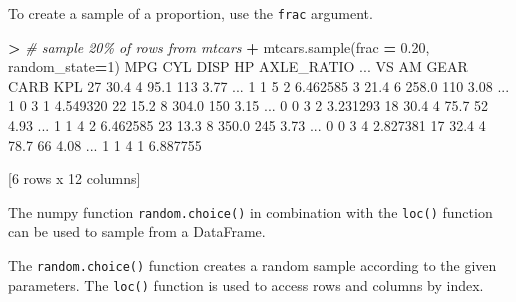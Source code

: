 \documentclass[
]{book}
\newenvironment{Shaded}{\begin{snugshade}}{\end{snugshade}}
\newcommand{\CommentTok}[1]{\textcolor[rgb]{0.56,0.35,0.01}{\textit{#1}}}
\newcommand{\DecValTok}[1]{\textcolor[rgb]{0.00,0.00,0.81}{#1}}
\newcommand{\FloatTok}[1]{\textcolor[rgb]{0.00,0.00,0.81}{#1}}
\newcommand{\NormalTok}[1]{#1}
\newcommand{\OperatorTok}[1]{\textcolor[rgb]{0.81,0.36,0.00}{\textbf{#1}}}
\begin{document}
To create a sample of a proportion, use the \texttt{frac} argument.

\begin{Shaded}
\begin{Highlighting}[]
\OperatorTok{\textgreater{}} \CommentTok{\# sample 20\% of rows from mtcars}
\OperatorTok{+}\NormalTok{ mtcars.sample(frac }\OperatorTok{=} \FloatTok{0.20}\NormalTok{, random\_state}\OperatorTok{=}\DecValTok{1}\NormalTok{)}
\NormalTok{     MPG  CYL   DISP   HP  AXLE\_RATIO  ...  VS  AM  GEAR CARB       KPL}
\DecValTok{27}  \FloatTok{30.4}    \DecValTok{4}   \FloatTok{95.1}  \DecValTok{113}        \FloatTok{3.77}\NormalTok{  ...   }\DecValTok{1}   \DecValTok{1}     \DecValTok{5}    \DecValTok{2}  \FloatTok{6.462585}
\DecValTok{3}   \FloatTok{21.4}    \DecValTok{6}  \FloatTok{258.0}  \DecValTok{110}        \FloatTok{3.08}\NormalTok{  ...   }\DecValTok{1}   \DecValTok{0}     \DecValTok{3}    \DecValTok{1}  \FloatTok{4.549320}
\DecValTok{22}  \FloatTok{15.2}    \DecValTok{8}  \FloatTok{304.0}  \DecValTok{150}        \FloatTok{3.15}\NormalTok{  ...   }\DecValTok{0}   \DecValTok{0}     \DecValTok{3}    \DecValTok{2}  \FloatTok{3.231293}
\DecValTok{18}  \FloatTok{30.4}    \DecValTok{4}   \FloatTok{75.7}   \DecValTok{52}        \FloatTok{4.93}\NormalTok{  ...   }\DecValTok{1}   \DecValTok{1}     \DecValTok{4}    \DecValTok{2}  \FloatTok{6.462585}
\DecValTok{23}  \FloatTok{13.3}    \DecValTok{8}  \FloatTok{350.0}  \DecValTok{245}        \FloatTok{3.73}\NormalTok{  ...   }\DecValTok{0}   \DecValTok{0}     \DecValTok{3}    \DecValTok{4}  \FloatTok{2.827381}
\DecValTok{17}  \FloatTok{32.4}    \DecValTok{4}   \FloatTok{78.7}   \DecValTok{66}        \FloatTok{4.08}\NormalTok{  ...   }\DecValTok{1}   \DecValTok{1}     \DecValTok{4}    \DecValTok{1}  \FloatTok{6.887755}

\NormalTok{[}\DecValTok{6}\NormalTok{ rows x }\DecValTok{12}\NormalTok{ columns]}
\end{Highlighting}
\end{Shaded}

The numpy function \texttt{random.choice()} in combination with the \texttt{loc()} function can be used to sample from a DataFrame.

The \texttt{random.choice()} function creates a random sample according to the given parameters. The \texttt{loc()} function is used to access rows and columns by index.
\end{document}
